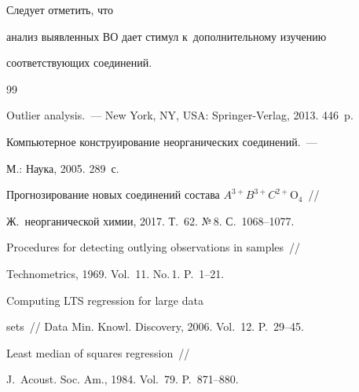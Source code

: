 Следует отметить, что 

анализ выявленных ВО дает стимул к~дополнительному изучению 

соответствующих соединений.



\vspace*{-3pt}

   

{\small\frenchspacing

{%


\begin{thebibliography}{99}



\vspace*{-3pt}




 Outlier analysis.~--- New York, NY, USA: Springer-Verlag, 2013. 446~p.


 Компьютерное конструирование неорганических соединений.~--- 

М.: Наука, 2005. 289~с.



Прогнозирование новых соединений состава $A^{3+}B^{3+}C^{2+}\mathrm{O}_4$~/\!\!/ 

Ж.~неорганической химии, 2017. Т.~62. №\,8. С.~1068--1077.


 Procedures for detecting outlying observations in samples~/\!\!/ 

Technometrics, 1969. Vol.~11. No.\,1. P.~1--21.


 Computing LTS regression for large data 

sets~/\!\!/ Data Min. Knowl. Discovery, 2006. Vol.~12. P.~29--45. 


 Least median of squares regression~/\!\!/ 

J.~Acoust. Soc. Am., 1984. Vol.~79. P.~871--880.



\end{thebibliography}}}
